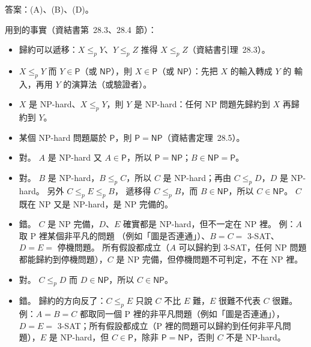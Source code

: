 \begin{pastsoln}
答案：(A)、(B)、(D)。

用到的事實（資結書第~28.3、28.4~節）：
\begin{itemize}
\item 歸約可以遞移：$X \le_p Y$、$Y \le_p Z$ 推得 $X \le_p Z$（資結書引理~28.3）。
\item $X \le_p Y$ 而 $Y \in \mathsf{P}$（或 $\mathsf{NP}$），則 $X \in \mathsf{P}$（或 $\mathsf{NP}$）：先把 $X$ 的輸入轉成 $Y$ 的
輸入，再用 $Y$ 的演算法（或驗證者）。
\item $X$ 是 NP-hard、$X \le_p Y$，則 $Y$ 是 NP-hard：任何 NP 問題先歸約到 $X$ 再歸約到 $Y$。
\item 某個 NP-hard 問題屬於 $\mathsf{P}$，則 $\mathsf{P} = \mathsf{NP}$（資結書定理~28.5）。
\end{itemize}

\begin{itemize}
\item[(A)] 對。 $A$ 是 NP-hard 又 $A \in \mathsf{P}$，所以 $\mathsf{P} = \mathsf{NP}$；$B \in \mathsf{NP} = \mathsf{P}$。
\item[(B)] 對。 $B$ 是 NP-hard，$B \le_p C$，所以 $C$ 是 NP-hard；再由 $C \le_p D$，$D$ 是 NP-hard。 另外 $C \le_p E \le_p B$，
遞移得 $C \le_p B$，而 $B \in \mathsf{NP}$，所以 $C \in \mathsf{NP}$。 $C$ 既在 NP 又是 NP-hard，是 NP 完備的。
\item[(C)] 錯。 $C$ 是 NP 完備，$D$、$E$ 確實都是 NP-hard，但不一定在 NP 裡。 例：$A$ 取 P 裡某個非平凡的問題
（例如「圖是否連通」）、$B = C = $ 3-SAT、$D = E = $ 停機問題。 所有假設都成立（$A$ 可以歸約到 3-SAT，任何 NP 問題
都能歸約到停機問題），$C$ 是 NP 完備，但停機問題不可判定，不在 NP 裡。
\item[(D)] 對。 $C \le_p D$ 而 $D \in \mathsf{NP}$，所以 $C \in \mathsf{NP}$。
\item[(E)] 錯。 歸約的方向反了：$C \le_p E$ 只說 $C$ 不比 $E$ 難，$E$ 很難不代表 $C$ 很難。 例：$A = B = C$ 都取同一個
P 裡的非平凡問題（例如「圖是否連通」），$D = E =$ 3-SAT；所有假設都成立（P 裡的問題可以歸約到任何非平凡問題），$E$ 是
NP-hard，但 $C \in \mathsf{P}$，除非 $\mathsf{P} = \mathsf{NP}$，否則 $C$ 不是 NP-hard。
\end{itemize}
\end{pastsoln}
